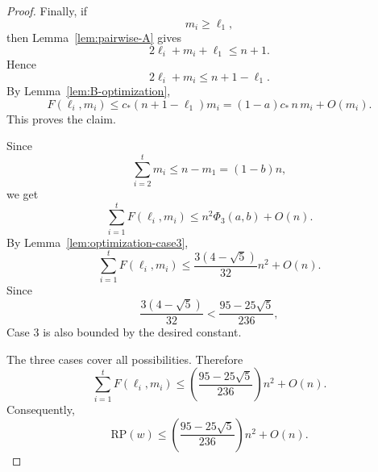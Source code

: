 \documentclass[runningheads,envcountsame,a4paper]{llncs}
\newcommand{\rp}{\mathrm{RP}}
\begin{document}
\begin{proof}
Finally, if
\[
        m_i\ge \ell_1,
\]
then Lemma~\ref{lem:pairwise-A} gives
\[
        2\ell_i+m_i+\ell_1\le n+1.
\]
Hence
\[
        2\ell_i+m_i\le n+1-\ell_1.
\]
By Lemma~\ref{lem:B-optimization},
\[
        F(\ell_i,m_i)
        \le
        c_*(n+1-\ell_1)m_i
        =
        (1-a)c_*\,n\,m_i+O(m_i).
\]
This proves the claim.

Since
\[
        \sum_{i=2}^tm_i\le n-m_1=(1-b)n,
\]
we get
\[
        \sum_{i=1}^tF(\ell_i,m_i)
        \le
        n^2\Phi_3(a,b)+O(n).
\]
By Lemma~\ref{lem:optimization-case3},
\[
        \sum_{i=1}^tF(\ell_i,m_i)
        \le
        \frac{3(4-\sqrt5)}{32}n^2+O(n).
\]
Since
\[
        \frac{3(4-\sqrt5)}{32}
        <
        \frac{95-25\sqrt5}{236},
\]
Case 3 is also bounded by the desired constant.

\medskip

The three cases cover all possibilities. Therefore
\[
        \sum_{i=1}^tF(\ell_i,m_i)
        \le
        \left(\frac{95-25\sqrt5}{236}\right)n^2+O(n).
\]
Consequently,
\[
        \rp(w)
        \le
        \left(\frac{95-25\sqrt5}{236}\right)n^2+O(n).
\]
\end{proof}

\fi













\end{document}
